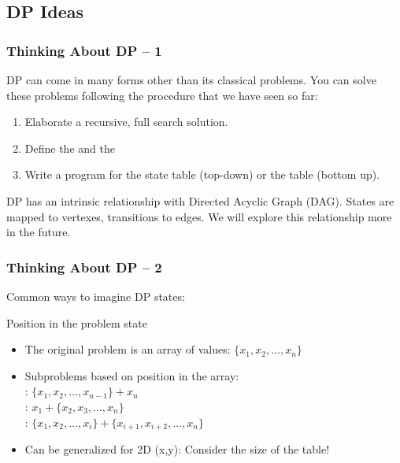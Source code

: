 \documentclass{beamer}
\begin{document}
\subsection{DP Ideas}
\begin{frame}
  \frametitle{Thinking About DP -- 1} 
  {\small 

    DP can come in many forms other than its classical problems. You
    can solve these problems following the procedure that we have seen
    so far:
    \begin{enumerate}
    \item Elaborate a recursive, full search solution.
    \item Define the  and the
    \item Write a program for  the state table
      (top-down) or  the table (bottom up).
    \end{enumerate}

    \bigskip

    \begin{block}{}
      DP has an intrinsic relationship with \alert{Directed Acyclic
        Graph (DAG)}. States are mapped to vertexes, transitions to
      edges. We will explore this relationship more in the future.
    \end{block}
  }
\end{frame}

\begin{frame}
  \frametitle{Thinking About DP -- 2}
  {\smaller
  Common ways to imagine DP states:
  \begin{block}{Position in the problem state}
    \begin{itemize}
    \item The original problem is an array of values: $\{x_1,x_2,\ldots,x_n\}$
      \medskip

    \item Subproblems based on position in the array:\\
      : $\{x_1, x_2,\ldots,x_{n-1}\} + x_n$\\
      : $x_1 + \{x_2,x_3,\ldots,x_n\}$\\
      : $\{x_1,x_2,\ldots,x_i\}+\{x_{i+1},x_{i+2},\ldots,x_n\}$
      \medskip

    \item Can be generalized for 2D (x,y): Consider the size of the table!
    \end{itemize}
  \end{block}
  }
\end{frame}
\end{document}
